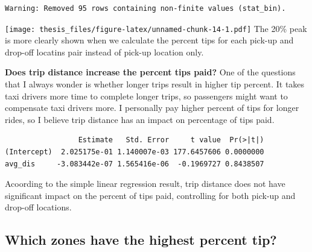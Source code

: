 \documentclass[12pt,twoside]{reedthesis}
\newenvironment{Shaded}{\begin{snugshade}}{\end{snugshade}}
\newcommand{\KeywordTok}[1]{\textcolor[rgb]{0.13,0.29,0.53}{\textbf{#1}}}
\newcommand{\DataTypeTok}[1]{\textcolor[rgb]{0.13,0.29,0.53}{#1}}
\newcommand{\DecValTok}[1]{\textcolor[rgb]{0.00,0.00,0.81}{#1}}
\newcommand{\StringTok}[1]{\textcolor[rgb]{0.31,0.60,0.02}{#1}}
\newcommand{\OperatorTok}[1]{\textcolor[rgb]{0.81,0.36,0.00}{\textbf{#1}}}
\newcommand{\NormalTok}[1]{#1}
\theoremstyle{definition}
\theoremstyle{definition}
\theoremstyle{definition}
\theoremstyle{remark}
\begin{document}
\begin{verbatim}
Warning: Removed 95 rows containing non-finite values (stat_bin).
\end{verbatim}
\texttt{[image: thesis\_files/figure-latex/unnamed-chunk-14-1.pdf]} The
20\% peak is more clearly shown when we calculate the percent tips for
each pick-up and drop-off locatins pair instead of pick-up location
only.

\textbf{Does trip distance increase the percent tips paid?} One of the
questions that I always wonder is whether longer trips result in higher
tip percent. It takes taxi drivers more time to complete longer trips,
so passengers might want to compensate taxi drivers more. I personally
pay higher percent of tips for longer rides, so I believe trip distance
has an impact on percentage of tips paid.
\begin{Shaded}
\end{Shaded}
\begin{verbatim}
                 Estimate   Std. Error     t value  Pr(>|t|)
(Intercept)  2.025175e-01 1.140007e-03 177.6457606 0.0000000
avg_dis     -3.083442e-07 1.565416e-06  -0.1969727 0.8438507
\end{verbatim}
Acoording to the simple linear regression result, trip distance does not
have significant impact on the percent of tips paid, controlling for
both pick-up and drop-off locations.

\subsection{Which zones have the highest percent
tip?}\label{which-zones-have-the-highest-percent-tip}
\end{document}
